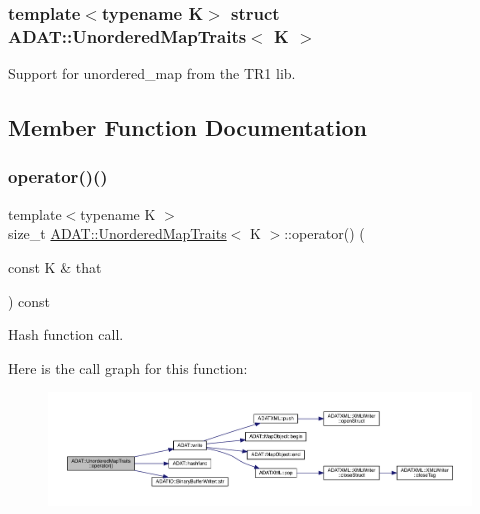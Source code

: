 \subsubsection*{template$<$typename K$>$\newline
struct A\+D\+A\+T\+::\+Unordered\+Map\+Traits$<$ K $>$}

Support for unordered\+\_\+map from the T\+R1 lib. 

\subsection{Member Function Documentation}
\mbox{\label{structADAT_1_1UnorderedMapTraits_ab9d8c80fb0f561fdadad5be6263d3f94}} 
\subsubsection{\texorpdfstring{operator()()}{operator()()}\hspace{0.1cm}{\footnotesize\ttfamily [1/4]}}
{\footnotesize\ttfamily template$<$typename K $>$ \\
size\+\_\+t \mbox{\hyperlink{structADAT_1_1UnorderedMapTraits}{A\+D\+A\+T\+::\+Unordered\+Map\+Traits}}$<$ K $>$\+::operator() (\begin{DoxyParamCaption}\item[{const K \&}]{that }\end{DoxyParamCaption}) const\hspace{0.3cm}{\ttfamily [inline]}}



Hash function call. 

Here is the call graph for this function\+:
\nopagebreak
\begin{figure}[H]
\begin{center}
\leavevmode
\includegraphics[width=350pt]{dd/d81/structADAT_1_1UnorderedMapTraits_ab9d8c80fb0f561fdadad5be6263d3f94_cgraph}
\end{center}
\end{figure}
\mbox{\label{structADAT_1_1UnorderedMapTraits_ab9d8c80fb0f561fdadad5be6263d3f94}} 
